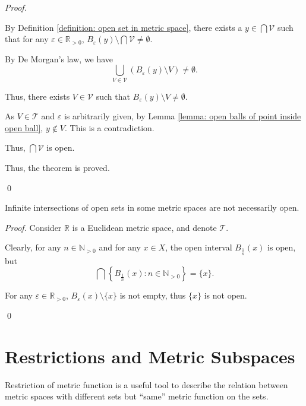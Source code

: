 \begin{theorem}
\begin{proof}
\begin{enumerate}[\bf O1.]
				By Definition \ref{definition: open set in metric space}, there exists a $y \in \bigcap \mathcal V$ such that for any $\varepsilon \in \mathbb R_{> 0}$, $B_\varepsilon(y) \setminus \bigcap \mathcal V \ne \emptyset$.
				
				By De Morgan's law, we have
				$$
				\bigcup_{V \in \mathcal V}(B_\varepsilon (y) \setminus V) \ne \emptyset.
				$$
				
				Thus, there exists $V \in \mathcal V$ such that $B_\varepsilon (y) \setminus V \ne \emptyset$.
				
				As $V \in \mathcal T$ and $\varepsilon$ is arbitrarily given, by Lemma \ref{lemma: open balls of point inside open ball}, $y \notin V$. This is a contradiction.
				
				Thus, $\bigcap \mathcal V$ is open.
				
				\qedlemma
		\end{enumerate}
		
		Thus, the theorem is proved.
		
		\qed
	\end{proof}
\end{theorem}


\begin{theorem}
	Infinite intersections of open sets in some metric spaces are not necessarily open.
	
	\begin{proof}
		Consider $\mathbb R$ is a Euclidean metric space, and denote $\mathcal T$.
		
		Clearly, for any $n \in \mathbb N_{> 0}$ and for any $x \in X$, the open interval $B_{\frac{1}{n}}(x)$ is open, but
		$$
		\bigcap\left\{ B_{\frac{1}{n}}\left( x \right) : n \in \mathbb N_{> 0} \right\} = \{ x \} .
		$$
		
		For any $\varepsilon \in \mathbb R_{> 0}$, $B_\varepsilon(x) \setminus \{x\}$ is not empty, thus $\{x\}$ is not open.
		
		\qed
	\end{proof}
\end{theorem}


\section{Restrictions and Metric Subspaces}


Restriction of metric function is a useful tool to describe the relation between metric spaces with different sets but ``same'' metric function on the sets.

